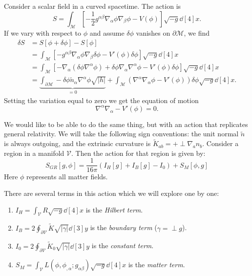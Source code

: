 \documentclass{jknotes}
\begin{document}
Consider a scalar field in a curved spacetime. The action is
\begin{equation}
    S = \int_{\mathcal{M}} \left[-\frac12g^{\alpha\beta}\nabla_\alpha\phi\nabla_\beta\phi - V(\phi)\right]\sqrt{-g}\dd[4]{x}.
\end{equation}
If we vary with respect to \(\phi\) and assume \(\delta \phi\) vanishes on \(\partial\mathcal{M}\), we find
\begin{align}
    \delta S &= S[\phi+\delta\phi] - S[\phi] \\
             &= \int_{\mathcal{M}}\left[-g^{\alpha\beta}\nabla_\alpha\phi\nabla_\beta\delta\phi - V'(\phi)\delta\phi\right]\sqrt{-g}\dd[4]{x} \\
             &= \int_{\mathcal{M}}\left[-\nabla_\alpha(\delta\phi\nabla^\alpha\phi)+\delta\phi\nabla_\alpha\nabla^\alpha\phi - V'(\phi)\delta\phi\right]\sqrt{-g}\dd[4]{x} \\
             &= \underbrace{\int_{\partial\mathcal{M}}-\delta\phi\tilde{n}_\alpha\nabla^\alpha\phi\sqrt{|h|}}_{=0} + \int_{\mathcal{M}}(\nabla^\alpha\nabla_\alpha\phi - V'(\phi))\delta\phi\sqrt{-g}\dd[4]{x}.
\end{align}
Setting the variation equal to zero we get the equation of motion
\begin{equation}
    \nabla^\alpha\nabla_\alpha - V'(\phi) = 0.
\end{equation}

We would like to be able to do the same thing, but with an action that replicates general relativity. We will take the following sign conventions: the unit normal \(\tilde{n}\) is always outgoing, and the extrinsic curvature is \(\tilde{K}_{ab} = + \perp\nabla_a n_b\). Consider a region in a manifold \(\mathcal{V}\). Then the action for that region is given by:
\begin{equation}
    S_{GR}[g,\phi] = \frac1{16\pi}\left(I_H[g] + I_B[g] - I_0\right) + S_M[\phi,g]
\end{equation}
Here \(\phi\) represents all matter fields.

There are several terms in this action which we will explore one by one:
\begin{enumerate}
    \item \(I_H = \int_{\mathcal{V}} R\sqrt{-g}\dd[4]{x}\) is the \emph{Hilbert term}.
    \item \(I_B = 2\oint_{\partial\mathcal{V}} \tilde{K}\sqrt{|\gamma|}\dd[3]{y}\) is the \emph{boundary term} (\(\gamma = \perp g\)).
    \item \(I_0 = 2\oint_{\partial\mathcal{V}} \tilde{K}_0\sqrt{|\gamma|}\dd[3]{y}\) is the \emph{constant term}.
    \item \(S_M = \int_{\mathcal{V}} L(\phi,\phi_{,\alpha};g_{\alpha\beta})\sqrt{-g}\dd[4]{x}\) is the \emph{matter term}.
\end{enumerate}
\end{document}
